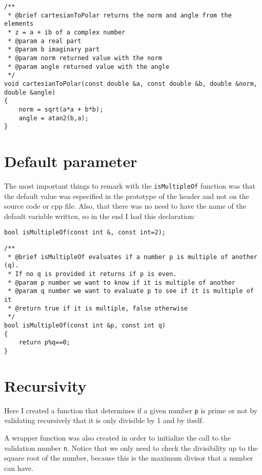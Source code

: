 \documentclass{article}
\begin{document}
\begin{lstlisting}[label=lst_mult,caption=Cartesian To Polar]
/**
 * @brief cartesianToPolar returns the norm and angle from the elements
 * z = a + ib of a complex number
 * @param a real part
 * @param b imaginary part
 * @param norm returned value with the norm
 * @param angle returned value with the angle
 */
void cartesianToPolar(const double &a, const double &b, double &norm, double &angle)
{
	norm = sqrt(a*a + b*b);
	angle = atan2(b,a);
}

\end{lstlisting} 

\section{Default parameter}
The most important things to remark with the \verb+isMultipleOf+
function was that the default value was especified in the
prototype of the header and not on the source code or cpp file.
Also, that there was no need to have the name of the 
default variable written, so in the end I had this declaration:

\verb+bool isMultipleOf(const int &, const int=2);+ 

\begin{lstlisting}[label=lbl_def,caption=Multiple Of]
/**
 * @brief isMultipleOf evaluates if a number p is multiple of another (q).
 * If no q is provided it returns if p is even.
 * @param p number we want to know if it is multiple of another
 * @param q number we want to evaluate p to see if it is multiple of it
 * @return true if it is multiple, false otherwise
 */
bool isMultipleOf(const int &p, const int q)
{
	return p%q==0;
}
\end{lstlisting} 

\section{Recursivity}

Here I created a function that determines if a given number
\verb+p+  is prime or not by validating recursively that it is only 
divisible by 1 and by itself. 

A wrapper function was also created in order to initialize 
the call to the validation number \verb+n+.
Notice that we only need to check the divisibility up to the 
square root of the number, because this is the maximum divisor
that a number can have.
\end{document}

